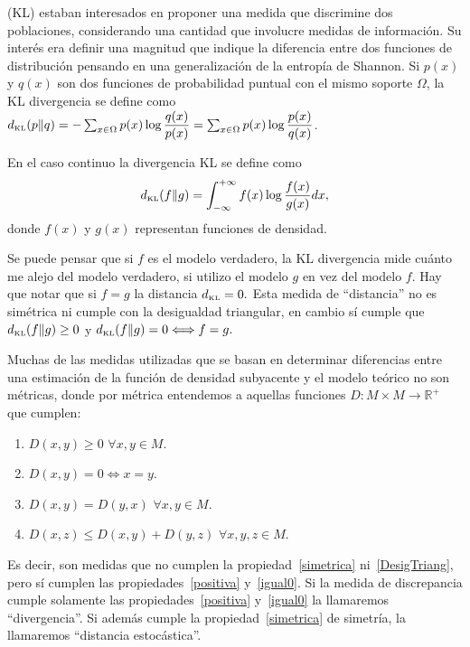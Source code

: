  \citet{KullbackLeibler1951} (KL) estaban interesados en proponer una medida que discrimine dos poblaciones, considerando una cantidad que involucre medidas de informaci\'on. Su inter\'es era definir una magnitud que indique la diferencia entre dos funciones de distribuci\'on pensando en una generalizaci\'on de la entrop\'ia de Shannon. Si $p(x)$ y $q(x)$ son dos funciones de probabilidad puntual con el mismo soporte $\Omega$, la KL divergencia se define como $d_{\text{\tiny{KL}}}(p \rVert q)=-\sum_{x \in \Omega} p(x) \log \dfrac{q(x)}{p(x)}=\sum_{x \in \Omega} p(x) \log\dfrac{p(x)}{q(x)}$. 

En el caso continuo la divergencia KL se define como 
\begin{align}
\label{KL}
d_{\text{\tiny{KL}}}(f \rVert g)=\int_{-\infty}^{+\infty} f(x) \log\dfrac{f(x)}{g(x)} dx,
\end{align} 
donde $f(x)$ y $g(x)$ representan funciones de densidad. 

Se puede pensar que si $f$ es el modelo verdadero, la KL divergencia mide cu\'anto me alejo del modelo verdadero, si utilizo el modelo $g$ en vez del modelo $f$. Hay que notar que si $f=g$ la distancia $d_\text{\tiny{KL}}=0.$ Esta medida de ``distancia'' no es sim\'etrica ni cumple con la desigualdad triangular,  en cambio s\'i cumple que $d_{\text{\tiny{KL}}}(f \rVert g)\geq 0$ y $d_{\text{\tiny{KL}}}(f \rVert g)= 0 \Longleftrightarrow f=g.$ 

Muchas de las medidas utilizadas que se basan en determinar diferencias entre una estimación de la función de densidad subyacente y el modelo teórico no son métricas, donde por métrica entendemos a aquellas funciones $D:M \times M\rightarrow \mathbb{R}^+$ que cumplen:

\begin{enumerate}
	\label{metrica}
	\item \label{positiva}$D(x,y)\geq 0$ $\forall x,y \in M$.
	\item \label{igual0}$D(x,y)= 0 \Leftrightarrow x=y$.
	\item \label{simetrica}$D(x,y)=D(y,x)$  $\forall x,y \in M$.
	\item \label{DesigTriang}$D(x,z)\leq D(x,y)+D(y,z)$  $\forall x,y,z \in M$.
\end{enumerate} 

Es decir, son medidas que no cumplen la propiedad~\ref{simetrica} ni~\ref{DesigTriang}, pero sí cumplen las propiedades~\ref{positiva} y~\ref{igual0}. 
Si la medida de discrepancia cumple solamente las propiedades~\ref{positiva} y~\ref{igual0} la llamaremos ``divergencia''. 
Si además cumple la propiedad~\ref{simetrica} de simetría, la llamaremos ``distancia estocástica''. 

